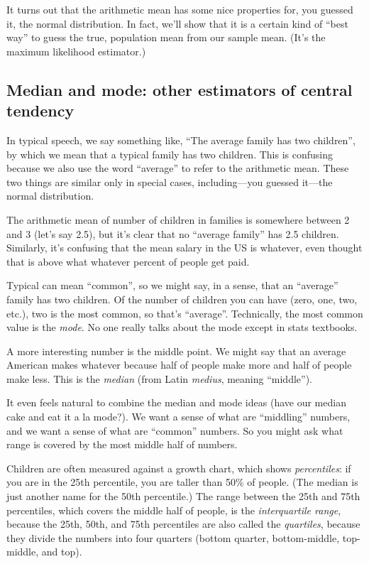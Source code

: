 It turns out that the arithmetic mean has some nice properties for, you
guessed it, the normal distribution. In fact, we'll show that it is a
certain kind of ``best way'' to guess the true, population mean from our
sample mean. (It's the maximum likelihood estimator.)

\subsection{Median and mode: other estimators of central tendency}

In typical speech, we say something like, ``The average family has two
children'', by which we mean that a typical family has two children.
This is confusing because we also use the word ``average'' to refer to
the arithmetic mean. These two things are similar only in special cases,
including---you guessed it---the normal distribution.

The arithmetic mean of number of children in families is somewhere
between 2 and 3 (let's say 2.5), but it's clear that no ``average
family'' has 2.5 children. Similarly, it's confusing that the mean
salary in the US is whatever, even thought that is above what whatever
percent of people get paid.

Typical can mean ``common'', so we might say, in a sense, that an
``average'' family has two children. Of the number of children you can
have (zero, one, two, etc.), two is the most common, so that's
``average''. Technically, the most common value is the \emph{mode}. No
one really talks about the mode except in stats textbooks.

A more interesting number is the middle point. We might say that an
average American makes whatever because half of people make more and
half of people make less. This is the \emph{median} (from Latin
\emph{medius}, meaning ``middle'').

It even feels natural to combine the median and mode ideas (have our
median cake and eat it a la mode?). We want a sense of what are
``middling'' numbers, and we want a sense of what are ``common''
numbers. So you might ask what range is covered by the most middle half
of numbers.

Children are often measured against a growth chart, which shows
\emph{percentiles}: if you are in the 25th percentile, you are taller
than 50\% of people. (The median is just another name for the 50th
percentile.) The range between the 25th and 75th percentiles, which
covers the middle half of people, is the \emph{interquartile range},
because the 25th, 50th, and 75th percentiles are also called the
\emph{quartiles}, because they divide the numbers into four quarters
(bottom quarter, bottom-middle, top-middle, and top).

